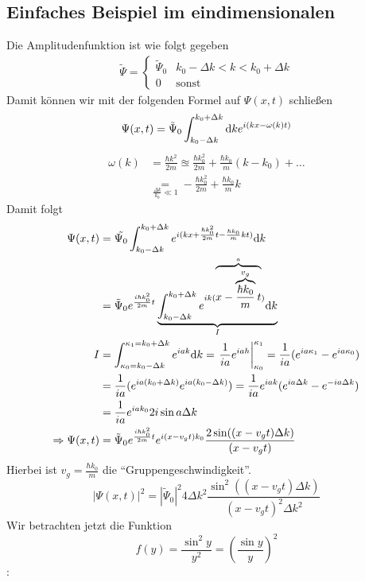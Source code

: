 
\subsection{Einfaches Beispiel im eindimensionalen}
Die Amplitudenfunktion ist wie folgt gegeben
\begin{align*}
\tilde{\Psi} = \begin{cases}
\tilde{\Psi}_0 & k_0 - \Delta k < k < k_0 + \Delta k\\
0 & \text{sonst}
\end{cases}
\end{align*}
Damit können wir mit der folgenden Formel auf $\Psi(x, t)$ schließen
$$\Psi(x,t) = \tilde{\Psi}_0 \int_{k_0-\Delta k}^{k_0+\Delta k} \mathrm d k e^{i(kx - \omega(k)t)}$$
\begin{align*}
\omega(k) &= \frac{\hbar k^2}{2m} \approxeq \frac{\hbar k_0^2}{2m} + \frac{\hbar k_0}{m}(k - k_0) + \dots\\
&\underset{\frac{\Delta k}{k_0} \ll 1}{=} - \frac{\hbar k_0^2}{2m} + \frac{\hbar k_0}{m} k
\end{align*}
Damit folgt
\begin{align*}
\Psi(x,t) &= \tilde{\Psi_0} \int_{k_0 - \Delta k}^{k_0 + \Delta k} e^{i (kx + \frac{\hbar k_0^2}{2m}t - \frac{\hbar k_0}{m} k t)} \mathrm d k\\
&= \tilde{\Psi}_0  e^{\frac{i \hbar k_0^2}{2m}t}  \underbrace{\int_{k_0 - \Delta k}^{k_0 + \Delta k} e^{ik(\overbrace{x - \overbrace{\frac{\hbar k_0}{m}}^{v_g}t}^a)} \mathrm d k}_{I}\\
I &= \int_{\kappa_0 = k_0-\Delta k}^{\kappa_1 = k_0 + \Delta k} e^{iak} \mathrm d k = \left. \frac{1}{ia} e^{i a h} \right|_{\kappa_0}^{\kappa_1} = \frac1{ia} (e^{ia\kappa_1} - e^{ia\kappa_0})\\
&=\frac{1}{ia} (e^{ia(k_0 + \Delta k)} e^{ia (k_0 - \Delta k)}) = \frac{1}{ia} e^{iak} (e^{ia \Delta k} - e^{-ia \Delta k})\\
&= \frac{1}{ia} e^{ia k_0} 2 i \sin a \Delta k\\
\Rightarrow \Psi(x,t) &= \tilde{\Psi}_0 e^{\frac{i\hbar k_0^2}{2m} t} e^{i (x - v_g t) k_0} \frac{2 \sin((x - v_g t)\Delta k)}{(x - v_g t)}
\end{align*}
Hierbei ist $v_g = \frac{\hbar k_0}{m}$ die "`Gruppengeschwindigkeit"'.
$$|\Psi(x,t)|^2 = |\tilde{\Psi}_0|^2 4 \Delta k^2 \frac{\sin^2((x - v_g t)\Delta k)}{(x - v_g t)^2 \Delta k^2}$$
Wir betrachten jetzt die Funktion $$f(y) = \frac{\sin^2 y}{y^2} = \left(\frac{\sin y}{y}\right)^2$$:
\begin{center}
\end{center}

